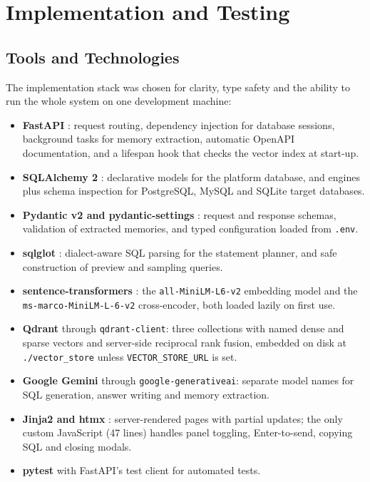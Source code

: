 \chapter{Implementation and Testing}

\section{Tools and Technologies}
The implementation stack was chosen for clarity, type safety and the ability to run the
whole system on one development machine:

\begin{itemize}[leftmargin=*, topsep=4pt, itemsep=4pt]
    \item \textbf{FastAPI} \cite{fastapi}: request routing, dependency injection for database
          sessions, background tasks for memory extraction, automatic OpenAPI documentation,
          and a lifespan hook that checks the vector index at start-up.
    \item \textbf{SQLAlchemy 2} \cite{sqlalchemydocs}: declarative models for the platform
          database, and engines plus schema inspection for PostgreSQL, MySQL and SQLite target
          databases.
    \item \textbf{Pydantic v2 and pydantic-settings} \cite{pydanticdocs}: request and response
          schemas, validation of extracted memories, and typed configuration loaded from
          \texttt{.env}.
    \item \textbf{sqlglot} \cite{sqlglotdocs}: dialect-aware SQL parsing for the statement
          planner, and safe construction of preview and sampling queries.
    \item \textbf{sentence-transformers} \cite{sbertdocs}: the \texttt{all-MiniLM-L6-v2}
          embedding model and the \texttt{ms-marco-MiniLM-L-6-v2} cross-encoder, both loaded
          lazily on first use.
    \item \textbf{Qdrant} \cite{qdrantdocs} through \texttt{qdrant-client}: three collections
          with named dense and sparse vectors and server-side reciprocal rank fusion, embedded
          on disk at \texttt{./vector\_store} unless \texttt{VECTOR\_STORE\_URL} is set.
    \item \textbf{Google Gemini} \cite{geminidocs} through \texttt{google-generativeai}:
          separate model names for SQL generation, answer writing and memory extraction.
    \item \textbf{Jinja2 and htmx} \cite{htmxdocs}: server-rendered pages with partial
          updates; the only custom JavaScript (47 lines) handles panel toggling,
          Enter-to-send, copying SQL and closing modals.
    \item \textbf{pytest} \cite{pytestdocs} with FastAPI's test client for automated tests.
\end{itemize}

